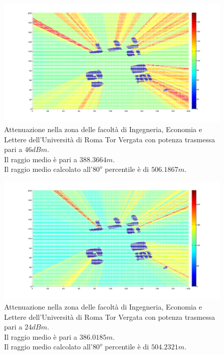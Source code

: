 \begin{figure}[!h]
\centering
\includegraphics[height=0.5\textwidth]{Immagini/TorVergataIng/attenuazione}
\caption{Attenuazione nella zona delle facoltà di Ingegneria, Economia e Lettere dell'Università di Roma Tor Vergata con potenza
trasmessa pari a $46dBm$. \\
Il raggio medio è pari a $388.3664 m$.\\
Il raggio medio calcolato all'$80^o$ percentile è di $506.1867 m$.}
\label{img:atting}
\end{figure}

\begin{figure}
\centering
\includegraphics[height=0.5\textwidth]{Immagini/TorVergataIng/attenuazione_pico}
\caption{Attenuazione nella zona delle facoltà di Ingegneria, Economia e Lettere dell'Università di Roma Tor Vergata con potenza
trasmessa pari a $24dBm$. \\
Il raggio medio è pari a $386.0185 m$. \\
Il raggio medio calcolato all'$80^o$ percentile è di $504.2321 m$.}
\label{img:attingpico}
\end{figure}


